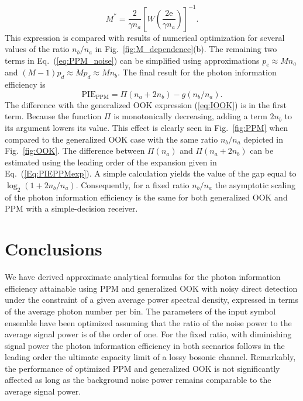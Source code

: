 \documentclass[conference]{IEEEtran}
\newcommand{\optval}[1]{#1^\ast}
\newcommand{\Eul}{\mathrm{e}}
\begin{document}
\begin{equation}\label{eq:opt_M_apr_noise}
\optval{M} = \frac{2}{\gamma n_{a}} \left[ W \left( \frac{2 \Eul }{\gamma n_{a} } \right) \right] ^{-1}.
\end{equation}
This expression is compared with results of numerical optimization for several values of the ratio $n_b/n_a$ in Fig.~\ref{fig:M_dependence}(b).
The remaining two terms in Eq.~(\ref{eq:PPM_noise}) can be simplified using approximations $p_e \approx M n_a$ and $(M-1)p_d \approx M p_d \approx M n_b$. The final result for the photon information efficiency is
\begin{equation}\label{eq:IPPM_noise}
{\text{PIE}}_{\text{PPM}} =  {\Pi}(n_a + 2 n_b) -  g(n_b/n_{a}).
\end{equation}
The difference with the generalized OOK expression (\ref{eq:IOOK}) is in the first term. Because the function $\Pi$ is monotonically decreasing, adding a term $2n_b$ to its argument lowers its value. This effect is clearly seen in Fig.~\ref{fig:PPM} when compared to the generalized OOK case with the same ratio $n_b/n_a$ depicted in Fig.~\ref{fig:OOK}. The difference between ${\Pi}(n_a)$ and ${\Pi}(n_a + 2 n_b)$ can be estimated using the leading order of the expansion given in Eq.~(\ref{Eq:PIEPPMexp}). A simple calculation yields the value of the gap equal to $\log_2(1+2n_b/n_a)$. Consequently, for a fixed ratio $n_b/n_a$ the asymptotic scaling of the photon information efficiency is the same for both generalized OOK and PPM with a simple-decision receiver.







\section{Conclusions}
\label{Sec:Conslusions}

We have derived approximate analytical formulas for the photon information efficiency attainable using PPM and generalized OOK with noisy direct detection under the constraint of a given average power spectral density, expressed in terms of the average photon number per bin. The parameters of the input symbol ensemble have been optimized assuming that the ratio of the noise power to the average signal power is of the order of one. For the fixed ratio, with diminishing signal power the photon information efficiency in both scenarios follows in the leading order the ultimate capacity limit of a lossy bosonic channel. Remarkably, the performance of optimized PPM and generalized OOK is not significantly affected as long as the background noise power remains comparable to the average signal power.
\end{document}
